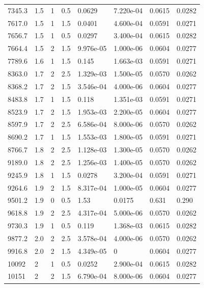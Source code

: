 \documentclass[preview]{standalone}
\begin{document}
{{{\begin{tabular}{L{1.2cm}C{1.2cm} C{0.3cm}C{0.5cm} C{1.4cm}C{1.4cm} C{1.4cm}C{1.4cm}}
  7345.3  &   1.5  & 1     & 0.5 &  0.0629  & 7.220e-04  & 0.0615 &  0.0282   \\ 
  7617.0  &   1.5  & 1     & 1.5 &  0.0401  & 4.600e-04  & 0.0591 &  0.0271   \\ 
  7656.7  &   1.5  & 1     & 0.5 &  0.0297  & 3.400e-04  & 0.0615 &  0.0282   \\ 
  7664.4  &   1.5  & 2     & 1.5 &  9.976e-05  & 1.000e-06  & 0.0604 &  0.0277   \\ 
  7789.6  &   1.6  & 1     & 1.5 &  0.145  & 1.663e-03  & 0.0591 &  0.0271   \\ 
  8363.0  &   1.7  & 2     & 2.5 &  1.329e-03  & 1.500e-05  & 0.0570 &  0.0262   \\ 
  8368.2  &   1.7  & 2     & 1.5 &  3.546e-04  & 4.000e-06  & 0.0604 &  0.0277   \\ 
  8483.8  &   1.7  & 1     & 1.5 &  0.118  & 1.351e-03  & 0.0591 &  0.0271   \\ 
  8523.9  &   1.7  & 2     & 1.5 &  1.953e-03  & 2.200e-05  & 0.0604 &  0.0277   \\ 
  8597.9  &   1.7  & 2     & 2.5 &  6.586e-04  & 8.000e-06  & 0.0570 &  0.0262   \\ 
  8690.2  &   1.7  & 1     & 1.5 &  1.553e-03  & 1.800e-05  & 0.0591 &  0.0271   \\ 
  8766.7  &   1.8  & 2     & 2.5 &  1.128e-03  & 1.300e-05  & 0.0570 &  0.0262   \\ 
  9189.0  &   1.8  & 2     & 2.5 &  1.256e-03  & 1.400e-05  & 0.0570 &  0.0262   \\ 
  9245.9  &   1.8  & 1     & 1.5 &  0.0278  & 3.200e-04  & 0.0591 &  0.0271   \\ 
  9264.6  &   1.9  & 2     & 1.5 &  8.317e-04  & 1.000e-05  & 0.0604 &  0.0277   \\ 
  9501.2  &   1.9  & 0     & 0.5 &  1.53  & 0.0175  & 0.631 &  0.290   \\ 
  9618.8  &   1.9  & 2     & 2.5 &  4.317e-04  & 5.000e-06  & 0.0570 &  0.0262   \\ 
  9730.3  &   1.9  & 1     & 0.5 &  0.119  & 1.368e-03  & 0.0615 &  0.0282   \\ 
  9877.2  &   2.0  & 2     & 2.5 &  3.578e-04  & 4.000e-06  & 0.0570 &  0.0262   \\ 
  9916.8  &   2.0  & 2     & 1.5 &  4.349e-05  & 0  & 0.0604 &  0.0277   \\ 
  10092  &     2  & 1     & 0.5 &  0.0252  & 2.900e-04  & 0.0615 &  0.0282   \\ 
  10151  &     2  & 2     & 1.5 &  6.790e-04  & 8.000e-06  & 0.0604 &  0.0277   \\ 

\end{tabular}}}}
\end{document}
